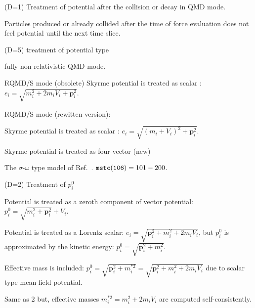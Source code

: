 \documentclass[]{article}
\newenvironment{entry}%
{\begin{list}{}{\setlength{\topsep}{0mm} \setlength{\itemsep}{0mm}
\setlength{\parskip}{0mm} \setlength{\parsep}{0mm}
\setlength{\leftmargin}{20mm} \setlength{\rightmargin}{0mm}
\setlength{\labelwidth}{18mm} \setlength{\labelsep}{2mm}}}%
{\end{list}}
\newenvironment{subentry}%
{\begin{list}{}{\setlength{\topsep}{0mm} \setlength{\itemsep}{0mm}
\setlength{\parskip}{0mm} \setlength{\parsep}{0mm}
\setlength{\leftmargin}{10mm} \setlength{\rightmargin}{0mm}
\setlength{\labelwidth}{18mm} \setlength{\labelsep}{2mm}}}%
{\end{list}}
\newcommand{\ttt}[1]{{\tt#1}}
\newcommand{\itemt}[1]{\item[{\tt #1}\hfill]}
\begin{document}
\begin{entry}
\itemt{mstc(107) :}(D=1) Treatment of potential after the collision
or decay in QMD mode.
 \begin{subentry}
    \itemt{$=0$ :} Particles produced or already collided after the time
                 of force evaluation does not feel potential until the next time slice.
    \itemt{$=1$ :} 
 \end{subentry}

\itemt{mstc(108) :}(D=5) treatment of potential type
 \begin{subentry}
  \itemt{$=0$ :} fully non-relativistic QMD mode.
  \itemt{$=1$ :} RQMD/S mode (obsolete)
   Skyrme potential is treated as scalar :
  $e_i=\sqrt{m_i^2 + 2m_i V_i + \bm{p}_i^2}$.
  \itemt{$=2$ :} RQMD/S mode (rewitten version):
  \itemt{$=3$ :} Skyrme potential is treated as scalar : 
  $e_i=\sqrt{(m_i+V_i)^2 + \bm{p}_i^2}$.
  \itemt{$=4$ :} Skyrme potential is treated as four-vector (new)
  \itemt{$=5$ :} The $\sigma$-$\omega$ type model of
                  Ref.~\cite{Gorenstein,Lang}.
  $\ttt{mstc(106)}=101-200$.
 \end{subentry}
 




\itemt{mstc(109) :}(D=2) Treatment of $p^0_i$
 \begin{subentry}
    \itemt{$=0$ :} Potential is treated as a zeroth component of 
    vector potential: $p^0_i=\sqrt{m_i^2+\bm{p}_i^2}+V_i$.
    \itemt{$=1$ :} Potential is treated as a Lorentz scalar:
      $e_i=\sqrt{\bm{p}_i^2+m_i^2+2m_iV_i}$, but
      $p^0_i$ is approximated by the kinetic energy:
       $p^0_i=\sqrt{\bm{p}_i^2+m_i^2}$.
    \itemt{$=2$ :} Effective mass is included: 
      $p^0_i=\sqrt{\bm{p}_i^2+m_i^{*2}}=\sqrt{\bm{p}_i^2+m_i^2+2m_iV_i}$
     due to scalar type mean field potential.
    \itemt{$=3$ :} Same as 2 but, effective masses $m_i^{*2} = m_i^2 + 2m_iV_i$
    are computed self-consistently.
 \end{subentry}


\end{entry}
\end{document}
